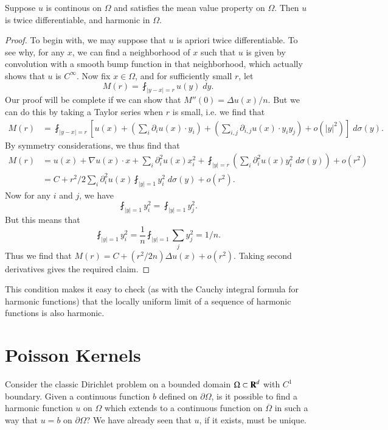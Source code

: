 \begin{theorem}
    Suppose $u$ is continous on $\Omega$ and satisfies the mean value property on $\Omega$. Then $u$ is twice differentiable, and harmonic in $\Omega$.
\end{theorem}
\begin{proof}
    To begin with, we may suppose that $u$ is apriori twice differentiable. To see why, for any $x$, we can find a neighborhood of $x$ such that $u$ is given by convolution with a smooth bump function in that neighborhood, which actually shows that $u$ is $C^\infty$. Now fix $x \in \Omega$, and for sufficiently small $r$, let
    \[ M(r) = \fint_{|y - x| = r} u(y)\; dy. \]
    Our proof will be complete if we can show that $M''(0) = \Delta u(x) / n$. But we can do this by taking a Taylor series when $r$ is small, i.e. we find that
    \begin{align*}
        M(r) &= \fint_{|y - x| = r} \left[ u(x) + \left( \sum_i \partial_i u(x) \cdot y_i \right) + \left( \sum_{i,j} \partial_{i,j} u(x) \cdot y_i y_j \right) + o(|y|^2) \right]\; d\sigma(y).
    \end{align*}
    By symmetry considerations, we thus find that
    \begin{align*}
        M(r) &= u(x) + \nabla u(x) \cdot x + \sum_i \partial_i^2 u(x) x_i^2 + \fint_{|y| = r} \left( \sum_i \partial_i^2 u(x) y_i^2\; d\sigma(y) \right) + o(r^2)\\
        &= C + r^2/2 \sum_i \partial_i^2 u(x) \fint_{|y| = 1} y_i^2\; d\sigma(y) + o(r^2).
    \end{align*}
    Now for any $i$ and $j$, we have
    \[ \fint_{|y| = 1} y_i^2 = \fint_{|y| = 1} y_j^2. \]
    But this means that
    \[ \fint_{|y| = 1} y_i^2 = \frac{1}{n} \fint_{|y| = 1} \sum_j y_j^2 = 1/n. \]
    Thus we find that $M(r) = C + (r^2/2n) \Delta u(x) + o(r^2)$. Taking second derivatives gives the required claim.
\end{proof}

This condition makes it easy to check (as with the Cauchy integral formula for harmonic functions) that the locally uniform limit of a sequence of harmonic functions is also harmonic.

\section{Poisson Kernels}

Consider the classic Dirichlet problem on a bounded domain $\Omega \subset \operatorname{\mathbf{R}}^d$ with $C^1$ boundary. Given a continuous function $b$ defined on $\partial \Omega$, is it possible to find a harmonic function $u$ on $\Omega$ which extends to a continuous function on $\overline{\Omega}$ in such a way that $u = b$ on $\partial \Omega$? We have already seen that $u$, if it exists, must be unique.

